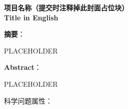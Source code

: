 
\begin{center}\bf\Large 项目名称（提交时注释掉此封面占位块）\\
Title in English
\end{center}

\textbf{摘要}：

PLACEHOLDER

\textbf{Abstract}：

PLACEHOLDER

科学问题属性：

\clearpage
